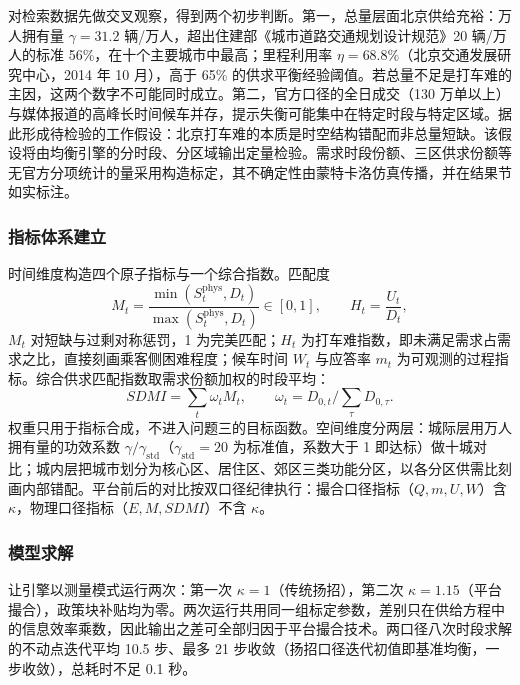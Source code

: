 \documentclass[12pt,a4paper]{ctexart}
\begin{document}
对检索数据先做交叉观察，得到两个初步判断。第一，总量层面北京供给充裕：万人拥有量 $\gamma=31.2$ 辆/万人，超出住建部《城市道路交通规划设计规范》20 辆/万人的标准 56\%，在十个主要城市中最高；里程利用率 $\eta=68.8\%$（北京交通发展研究中心，2014 年 10 月），高于 65\% 的供求平衡经验阈值。若总量不足是打车难的主因，这两个数字不可能同时成立。第二，官方口径的全日成交（130 万单以上）与媒体报道的高峰长时间候车并存，提示失衡可能集中在特定时段与特定区域。据此形成待检验的工作假设：北京打车难的本质是时空结构错配而非总量短缺。该假设将由均衡引擎的分时段、分区域输出定量检验。需求时段份额、三区供求份额等无官方分项统计的量采用构造标定，其不确定性由蒙特卡洛仿真传播，并在结果节如实标注。

\subsubsection{指标体系建立}

时间维度构造四个原子指标与一个综合指数。匹配度
\begin{equation}
M_t=\frac{\min(S_t^{\mathrm{phys}},D_t)}{\max(S_t^{\mathrm{phys}},D_t)}\in[0,1],\qquad
H_t=\frac{U_t}{D_t}, \label{eq:MH}
\end{equation}
$M_t$ 对短缺与过剩对称惩罚，1 为完美匹配；$H_t$ 为打车难指数，即未满足需求占需求之比，直接刻画乘客侧困难程度；候车时间 $W_t$ 与应答率 $m_t$ 为可观测的过程指标。综合供求匹配指数取需求份额加权的时段平均：
\begin{equation}
SDMI = \sum_{t}\omega_t M_t,\qquad \omega_t = D_{0,t}\Big/\sum_{\tau}D_{0,\tau} . \label{eq:sdmi}
\end{equation}
权重只用于指标合成，不进入问题三的目标函数。空间维度分两层：城际层用万人拥有量的功效系数 $\gamma/\gamma_{\mathrm{std}}$（$\gamma_{\mathrm{std}}=20$ 为标准值，系数大于 1 即达标）做十城对比；城内层把城市划分为核心区、居住区、郊区三类功能分区，以各分区供需比刻画内部错配。平台前后的对比按双口径纪律执行：撮合口径指标（$Q,m,U,W$）含 $\kappa$，物理口径指标（$E,M,SDMI$）不含 $\kappa$。

\subsubsection{模型求解}

让引擎以测量模式运行两次：第一次 $\kappa=1$（传统扬招），第二次 $\kappa=1.15$（平台撮合），政策块补贴均为零。两次运行共用同一组标定参数，差别只在供给方程中的信息效率乘数，因此输出之差可全部归因于平台撮合技术。两口径八次时段求解的不动点迭代平均 10.5 步、最多 21 步收敛（扬招口径迭代初值即基准均衡，一步收敛），总耗时不足 0.1 秒。
\end{document}
